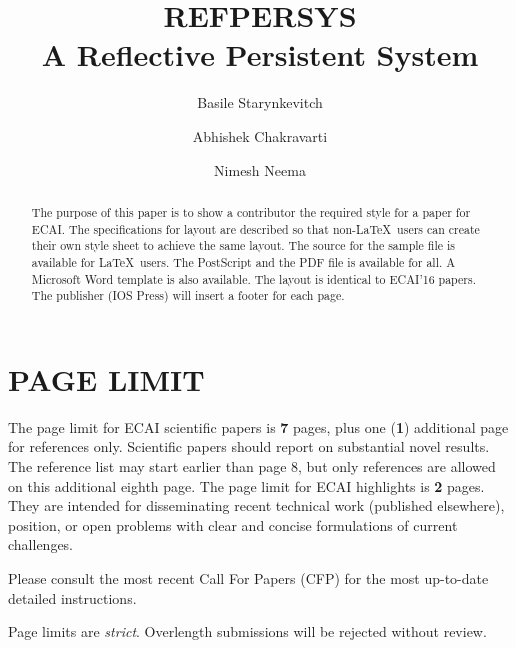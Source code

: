\documentclass{ecai}
\begin{document}
\title{REFPERSYS \\
A Reflective Persistent System}

\author{Basile Starynkevitch 
\and Abhishek Chakravarti 
\and  Nimesh Neema }

\maketitle


\begin{abstract}
  The purpose of this paper is to show a contributor the required
  style for a paper for ECAI. The specifications for layout are
  described so that non-\LaTeX\ users can create their own style sheet
  to achieve the same layout. The source for the sample file is
  available for \LaTeX\ users. The PostScript and the PDF file is
  available for all. A Microsoft Word template is also available. The
  layout is identical to ECAI'16 papers. The publisher (IOS Press)
  will insert a footer for each page.
\end{abstract}

\section{PAGE LIMIT}
%

The page limit for ECAI scientific papers is {\bf 7} pages, plus one ({\bf 1})
additional page for references only. Scientific papers should report on substantial novel results. The reference list may start earlier than page 8, but only references are allowed on this additional eighth page. 
The page limit for ECAI highlights is {\bf 2} pages. They are intended for disseminating  recent technical work (published elsewhere), position, or open problems with clear and concise formulations of current challenges. 


Please consult the most recent Call For Papers (CFP) for the most up-to-date
detailed instructions.

Page limits are \textit{strict}. Overlength submissions will be rejected without review. 
\end{document}
